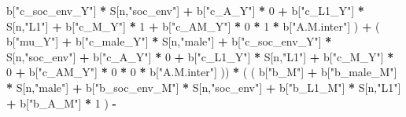 \documentclass[
]{book}
\newenvironment{Shaded}{\begin{snugshade}}{\end{snugshade}}
\newcommand{\DecValTok}[1]{\textcolor[rgb]{0.00,0.00,0.81}{#1}}
\newcommand{\NormalTok}[1]{#1}
\newcommand{\SpecialCharTok}[1]{\textcolor[rgb]{0.81,0.36,0.00}{\textbf{#1}}}
\newcommand{\StringTok}[1]{\textcolor[rgb]{0.31,0.60,0.02}{#1}}
\begin{document}
\begin{Shaded}
\begin{Highlighting}[]
\NormalTok{                                 b[}\StringTok{"c\_soc\_env\_Y"}\NormalTok{] }\SpecialCharTok{*}\NormalTok{ S[n,}\StringTok{"soc\_env"}\NormalTok{] }\SpecialCharTok{+} 
\NormalTok{                                 b[}\StringTok{"c\_A\_Y"}\NormalTok{] }\SpecialCharTok{*} \DecValTok{0} \SpecialCharTok{+} 
\NormalTok{                                 b[}\StringTok{"c\_L1\_Y"}\NormalTok{] }\SpecialCharTok{*}\NormalTok{ S[n,}\StringTok{"L1"}\NormalTok{] }\SpecialCharTok{+}
\NormalTok{                                 b[}\StringTok{"c\_M\_Y"}\NormalTok{] }\SpecialCharTok{*} \DecValTok{1} \SpecialCharTok{+}
\NormalTok{                                 b[}\StringTok{"c\_AM\_Y"}\NormalTok{] }\SpecialCharTok{*} \DecValTok{0} \SpecialCharTok{*} \DecValTok{1} \SpecialCharTok{*}\NormalTok{ b[}\StringTok{"A.M.inter"}\NormalTok{] ) }\SpecialCharTok{+} 
\NormalTok{                             ( b[}\StringTok{"mu\_Y"}\NormalTok{] }\SpecialCharTok{+} 
\NormalTok{                                 b[}\StringTok{"c\_male\_Y"}\NormalTok{] }\SpecialCharTok{*}\NormalTok{ S[n,}\StringTok{"male"}\NormalTok{] }\SpecialCharTok{+} 
\NormalTok{                                 b[}\StringTok{"c\_soc\_env\_Y"}\NormalTok{] }\SpecialCharTok{*}\NormalTok{ S[n,}\StringTok{"soc\_env"}\NormalTok{] }\SpecialCharTok{+} 
\NormalTok{                                 b[}\StringTok{"c\_A\_Y"}\NormalTok{] }\SpecialCharTok{*} \DecValTok{0} \SpecialCharTok{+} 
\NormalTok{                                 b[}\StringTok{"c\_L1\_Y"}\NormalTok{] }\SpecialCharTok{*}\NormalTok{ S[n,}\StringTok{"L1"}\NormalTok{] }\SpecialCharTok{+}
\NormalTok{                                 b[}\StringTok{"c\_M\_Y"}\NormalTok{] }\SpecialCharTok{*} \DecValTok{0} \SpecialCharTok{+}
\NormalTok{                                 b[}\StringTok{"c\_AM\_Y"}\NormalTok{] }\SpecialCharTok{*} \DecValTok{0} \SpecialCharTok{*} \DecValTok{0} \SpecialCharTok{*}\NormalTok{ b[}\StringTok{"A.M.inter"}\NormalTok{] )) }\SpecialCharTok{*}
\NormalTok{      ( ( b[}\StringTok{"b\_M"}\NormalTok{] }\SpecialCharTok{+} 
\NormalTok{            b[}\StringTok{"b\_male\_M"}\NormalTok{] }\SpecialCharTok{*}\NormalTok{ S[n,}\StringTok{"male"}\NormalTok{] }\SpecialCharTok{+} 
\NormalTok{            b[}\StringTok{"b\_soc\_env\_M"}\NormalTok{] }\SpecialCharTok{*}\NormalTok{ S[n,}\StringTok{"soc\_env"}\NormalTok{] }\SpecialCharTok{+} 
\NormalTok{            b[}\StringTok{"b\_L1\_M"}\NormalTok{] }\SpecialCharTok{*}\NormalTok{ S[n,}\StringTok{"L1"}\NormalTok{] }\SpecialCharTok{+}
\NormalTok{            b[}\StringTok{"b\_A\_M"}\NormalTok{] }\SpecialCharTok{*} \DecValTok{1}\NormalTok{ ) }\SpecialCharTok{{-}} 

\end{Highlighting}
\end{Shaded}
\end{document}
